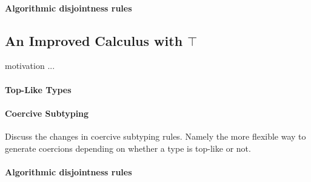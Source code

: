 \paragraph{Algorithmic disjointness rules}

\subsection{An Improved Calculus with $\top$}

motivation ...

\paragraph{Top-Like Types}

\paragraph{Coercive Subtyping} Discuss the changes in 
coercive subtyping rules. Namely the more flexible way to 
generate coercions depending on whether a type is top-like 
or not. 

\paragraph{Algorithmic disjointness rules}